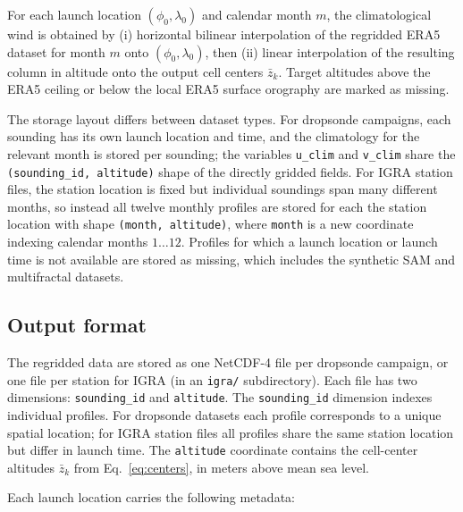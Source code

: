 \documentclass[11pt]{article}
\begin{document}
For each launch location $(\phi_0, \lambda_0)$ and calendar month $m$, the climatological wind is obtained by (i) horizontal bilinear interpolation of the regridded ERA5 dataset for month $m$ onto $(\phi_0, \lambda_0)$, then (ii) linear interpolation of the resulting column in altitude onto the output cell centers $\bar{z}_k$.  Target altitudes above the ERA5 ceiling or below the local ERA5 surface orography are marked as missing.


The storage layout differs between dataset types.  For dropsonde campaigns, each sounding has its own launch location and time, and the climatology for the relevant month is stored per sounding; the variables \texttt{u\_clim} and \texttt{v\_clim} share the \texttt{(sounding\_id, altitude)} shape of the directly gridded fields.  For IGRA station files, the station location is fixed but individual soundings span many different months, so instead all twelve monthly profiles are stored for each the station location with shape \texttt{(month, altitude)}, where \texttt{month} is a new coordinate indexing calendar months $1\dots 12$.  Profiles for which a launch location or launch time is not available are stored as missing, which includes the synthetic SAM and multifractal datasets.

\subsection{Output format} \label{sec:output}

The regridded data are stored as one NetCDF-4 file per dropsonde campaign, or one file per station for IGRA (in an \texttt{igra/} subdirectory).  Each file has two dimensions: \texttt{sounding\_id} and \texttt{altitude}.  The \texttt{sounding\_id} dimension indexes individual profiles.  For dropsonde datasets each profile corresponds to a unique spatial location; for IGRA station files all profiles share the same station location but differ in launch time.
The \texttt{altitude} coordinate contains the cell-center altitudes $\bar{z}_k$ from Eq.~\ref{eq:centers}, in meters above mean sea level.

Each launch location carries the following metadata:
\end{document}

